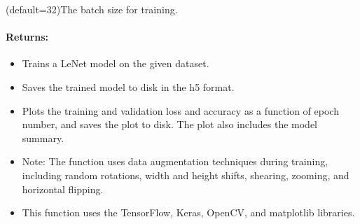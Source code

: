 \documentclass[letterpaper,10pt,english]{sphinxmanual}
\begin{document}
\begin{fulllineitems}
\begin{description}
\sphinxAtStartPar
(default=32)The batch size for training.

\end{description}


\paragraph{Returns:}
\label{\detokenize{akhdefo_functions:id12}}\begin{itemize}
\item {} 
\sphinxAtStartPar
Trains a LeNet model on the given dataset.

\item {} 
\sphinxAtStartPar
Saves the trained model to disk in the h5 format.

\item {} 
\sphinxAtStartPar
Plots the training and validation loss and accuracy as a function of epoch number, and saves the plot to disk. The plot also includes the model summary.

\item {} 
\sphinxAtStartPar
Note: The function uses data augmentation techniques during training, including random rotations, width and height shifts, shearing, zooming, and horizontal flipping.

\item {} 
\sphinxAtStartPar
This function uses the TensorFlow, Keras, OpenCV, and matplotlib libraries.

\end{itemize}

\end{fulllineitems}

\end{document}
